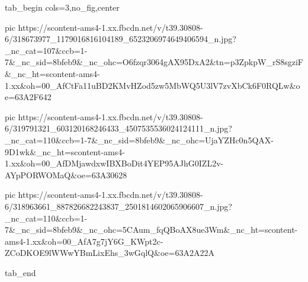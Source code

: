  
 
 
 
 


\ifcmt
  tab_begin cols=3,no_fig,center

     pic https://scontent-ams4-1.xx.fbcdn.net/v/t39.30808-6/318673977_1179016816104189_6523206974649406594_n.jpg?_nc_cat=107&ccb=1-7&_nc_sid=8bfeb9&_nc_ohc=O6fzqr3064gAX95DxA2&tn=p3ZpkpW_rS8sgziF&_nc_ht=scontent-ams4-1.xx&oh=00_AfCtFa11uBD2KMvHZod5zw5MbWQ5U3lV7zvXbCk6F0RQLw&oe=63A2F642

     pic https://scontent-ams4-1.xx.fbcdn.net/v/t39.30808-6/319791321_603120168246433_4507535536024124111_n.jpg?_nc_cat=110&ccb=1-7&_nc_sid=8bfeb9&_nc_ohc=UjaYZHc0n5QAX-9D1wk&_nc_ht=scontent-ams4-1.xx&oh=00_AfDMjawdxwIBXBoDit4YEP95AJhG0IZL2v-AYpPORWOMaQ&oe=63A30628

     pic https://scontent-ams4-1.xx.fbcdn.net/v/t39.30808-6/318963661_887826682243837_2501814602065906607_n.jpg?_nc_cat=110&ccb=1-7&_nc_sid=8bfeb9&_nc_ohc=5CAum_fqQBoAX8ue3Wm&_nc_ht=scontent-ams4-1.xx&oh=00_AfA7g7jY6G_KWpt2c-ZCoDKOE9lWWwYBmLixEhs_3wGqlQ&oe=63A2A22A

  tab_end
\fi
